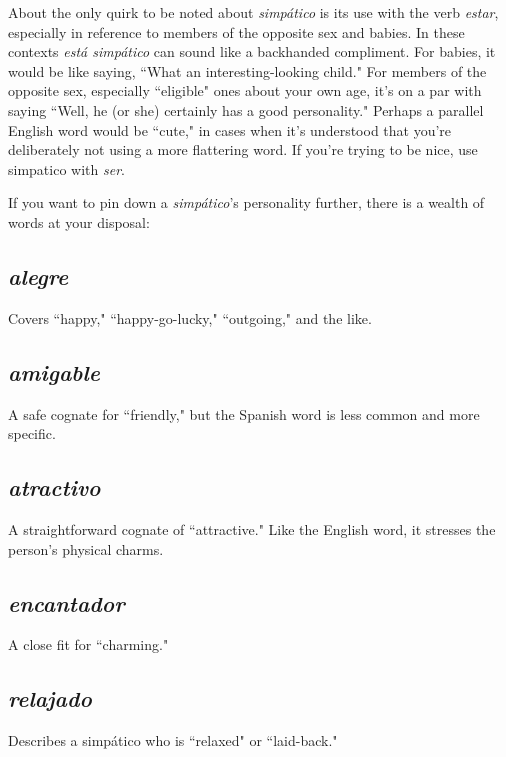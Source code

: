 About the only quirk to be noted about \emph{simpático} is its use
with the verb \emph{estar}, especially in reference to members of the opposite
sex and babies. In these contexts \emph{está simpático} can sound like a backhanded compliment. For babies, it would be like saying, ``What an
interesting-looking child." For members of the opposite sex, especially
``eligible" ones about your own age, it's on a par with saying ``Well, he
(or she) certainly has a good personality." Perhaps a parallel English
word would be ``cute," in cases when it's understood that you're deliberately not using a more flattering word. If you're trying to be nice, use
simpatico with \emph{ser}.

If you want to pin down a \emph{simpático}'s personality further,
there is a wealth of words at your disposal:

\subsection{\emph{alegre}}

Covers ``happy," ``happy-go-lucky," ``outgoing," and
the like.

\subsection{\emph{amigable}}

A safe cognate for ``friendly," but the Spanish
word is less common and more specific.

\subsection{\emph{atractivo}}

A straightforward cognate of ``attractive." Like
the English word, it stresses the person's physical charms.

\subsection{\emph{encantador}}

A close fit for ``charming."

\subsection{\emph{relajado}}

Describes a simpático who is ``relaxed" or ``laid-back."

